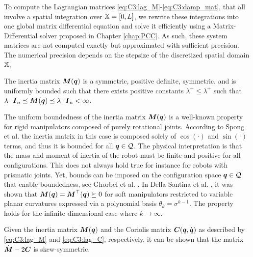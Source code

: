 To compute the Lagrangian matrices \eqref{eq:C3:lag_M}-\eqref{eq:C3:damp_mat}, that all involve a spatial integration over $\mathbb{X} = [0,L]$, we rewrite these integrations into one global matrix differential equation and solve it efficiently using a Matrix-Differential solver proposed in Chapter \ref{chap:PCC}. As such, these system matrices are not computed exactly but approximated with sufficient precision. The numerical precision depends on the stepsize of the discretized spatial domain $\mathbb{X}$. 
\begin{asm}
\label{lem:C3:1}
The inertia matrix $\boldsymbol{M}(\boldsymbol{q})$ is a symmetric, positive definite, symmetric. and is uniformly bounded such that there exists positive constants $\lambda^{-} \le \lambda^{+}$ such that  $\lambda^{-} \boldsymbol{I}_{n} \preceq \boldsymbol{M}(\boldsymbol{q}) \preceq \lambda^{+} \boldsymbol{I}_{n} < \infty$.
\end{asm}

The uniform boundedness of the inertia matrix ${\boldsymbol{M}}({\boldsymbol{q}})$ is a well-known property for rigid manipulators composed of purely rotational joints. According to Spong et al. \cite{Spong2006} the inertia matrix in this case is composed solely of $\cos(\cdot)$ and $\sin(\cdot)$ terms, and thus it is bounded for all ${\boldsymbol{q}} \in \mathcal{Q}$. The physical interpretation is that the mass and moment of inertia of the robot must be finite and positive for all configurations. This does not always hold true for instance for robots with prismatic joints. Yet, bounds can be imposed on the configuration space ${\boldsymbol{q}} \in \mathcal{Q}$ that enable boundedness, see Ghorbel et al. \cite{Ghorbel1998Dec}. In Della Santina et al. \cite{DellaSantina2020}, it was shown that ${\boldsymbol{M}}({\boldsymbol{q}}) = {\boldsymbol{M}}^\top({\boldsymbol{q}}) \succeq 0$ for soft manipulators restricted to variable planar curvatures expressed via a polynomial basis $\theta_k = \sigma^{k-1}$. The property holds for the infinite dimensional case where $k \to \infty$. 

\begin{lem}
\label{lem:C3:passive}
Given the inertia matrix $\boldsymbol{M}(\boldsymbol{q})$ and the Coriolis matrix
$\boldsymbol{C}(\boldsymbol{q},\dot{\boldsymbol{q}})$ as described by \eqref{eq:C3:lag_M} and \eqref{eq:C3:lag_C}, respectively, it can be shown that the matrix $\dot{\boldsymbol{M}} - 2\boldsymbol{C}$ is skew-symmetric.
\end{lem}


